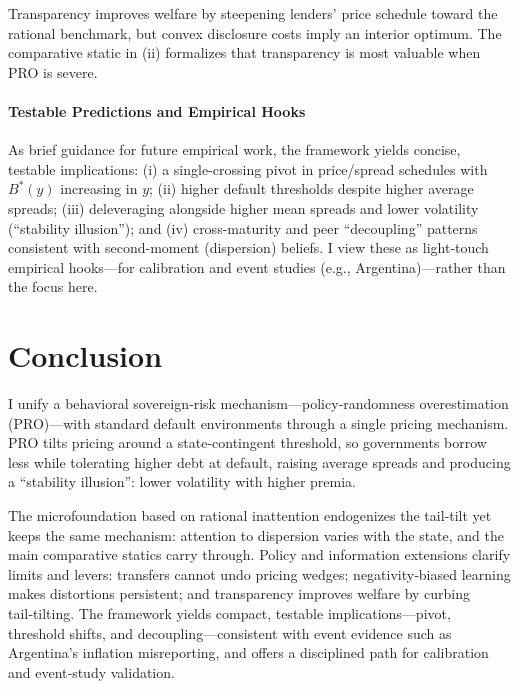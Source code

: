 \documentclass[12pt]{article}
\theoremstyle{plain}
\begin{document}
Transparency improves welfare by steepening lenders' price schedule toward the
rational benchmark, but convex disclosure costs imply an interior optimum. The
comparative static in (ii) formalizes that transparency is most valuable when
PRO is severe.

\paragraph{Testable Predictions and Empirical Hooks}
As brief guidance for future empirical work, the framework yields concise,
testable implications: (i) a single-crossing pivot in price/spread schedules
with $B^*(y)$ increasing in $y$; (ii) higher default thresholds despite higher
average spreads; (iii) deleveraging alongside higher mean spreads and lower
volatility (``stability illusion''); and (iv) cross-maturity and peer
``decoupling'' patterns consistent with second-moment (dispersion) beliefs. I
view these as light-touch empirical hooks—for calibration and event studies
(e.g., Argentina)—rather than the focus here.

\section{Conclusion}

I unify a behavioral sovereign‑risk mechanism—policy‑randomness overestimation
(PRO)—with standard default environments through a single pricing mechanism.
PRO tilts pricing around a state‑contingent threshold, so governments borrow
less while tolerating higher debt at default, raising average spreads and
producing a “stability illusion”: lower volatility with higher premia.

The microfoundation based on rational inattention endogenizes the tail‑tilt yet
keeps the same mechanism: attention to dispersion varies with the state, and
the main comparative statics carry through. Policy and information extensions
clarify limits and levers: transfers cannot undo pricing wedges;
negativity‑biased learning makes distortions persistent; and transparency
improves welfare by curbing tail‑tilting. The framework yields compact,
testable implications—pivot, threshold shifts, and decoupling—consistent with
event evidence such as Argentina’s inflation misreporting, and offers a
disciplined path for calibration and event‑study validation.

\clearpage
\appendix

\setcounter{equation}{0}
\renewcommand{\theequation}{\thesection.\arabic{equation}}
\end{document}
